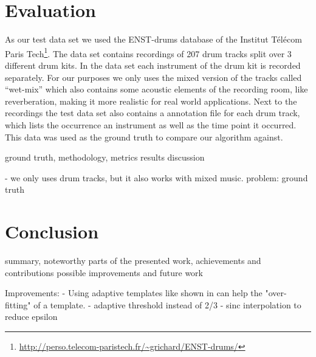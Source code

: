 \documentclass{article}
\begin{document}



\section{Evaluation}
\label{sec:evaluation}

As our test data set we used the ENST-drums database of the Institut Télécom Paris Tech\footnote{\url{http://perso.telecom-paristech.fr/~grichard/ENST-drums/}}.
The data set contains recordings of 207 drum tracks split over 3 different drum kits.
In the data set each instrument of the drum kit is recorded separately.
For our purposes we only uses the mixed version of the tracks called ``wet-mix'' which also contains some acoustic elements of the recording room, like reverberation, making it more realistic for real world applications.
Next to the recordings the test data set also contains a annotation file for each drum track, which lists the occurrence an instrument as well as the time point it occurred.
This data was used as the ground truth to compare our algorithm against.

ground truth, methodology, metrics
results
discussion

- we only uses drum tracks, but it also works with mixed music. problem: ground truth



\section{Conclusion}
\label{sec:conclusion}

summary, noteworthy parts of the presented work,
achievements and contributions
possible improvements and future work

Improvements: 
- Using adaptive templates like shown in \cite{lerch2015} can help the "over-fitting" of a template.
- adaptive threshold instead of 2/3
- sinc interpolation to reduce epsilon




\end{document}
